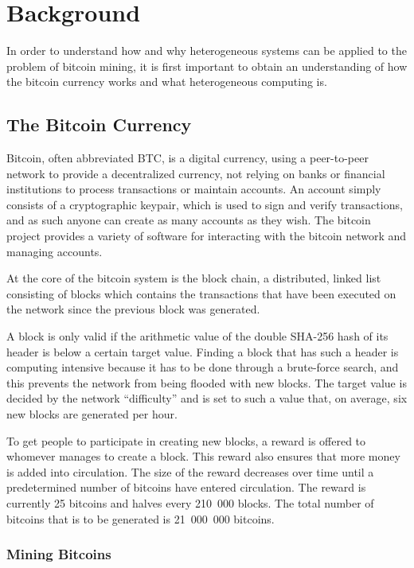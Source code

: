 \chapter{Background}
\label{cha:background}

In order to understand how and why heterogeneous systems can be applied to the problem of
bitcoin mining, it is first important to obtain an understanding of how the bitcoin currency
works and what heterogeneous computing is.

\section{The Bitcoin Currency}
\label{sec:bitcoins}
Bitcoin, often abbreviated BTC, is a digital currency, using a peer-to-peer network to provide
a decentralized currency, not relying on banks or financial institutions to process transactions
or maintain accounts. An account simply consists of a cryptographic keypair, which is used to sign
and verify transactions, and as such anyone can create as many accounts as they wish. The bitcoin
project provides a variety of software for interacting with the bitcoin network and managing
accounts.

At the core of the bitcoin system is the block chain, a distributed, linked list consisting of blocks
which contains the transactions that have been executed on the network since the previous block was
generated.

A block is only valid if the arithmetic value of the double SHA-256 hash of its header is below
a certain target value. Finding a block that has such a header is computing intensive because it
has to be done through a brute-force search, and this prevents the network from being flooded with
new blocks. The target value is decided by the network ``difficulty''
and is set to such a value that, on average, six new blocks are generated per hour.

To get people to participate in creating new blocks, a reward is offered to whomever manages to
create a block. This reward also ensures that more money is added into circulation. The size of
the reward decreases over time until a predetermined number of bitcoins have entered circulation.
The reward is currently 25 bitcoins and halves every 210~000 blocks. The total number of bitcoins
that is to be generated is 21~000~000 bitcoins. \cite{bitcoin}

\subsection{Mining Bitcoins}
\label{sec:bitcoin-mining}

